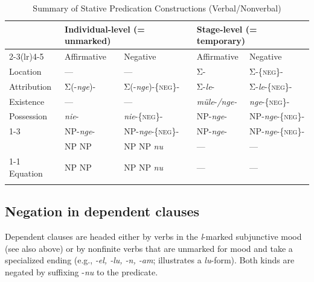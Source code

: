\documentclass[output=paper,colorlinks,citecolor=brown,draft]{langscibook}
\begin{document}
\begin{table} %
    \small 
    \begin{tabularx}{\textwidth}{Xllll}
    \lsptoprule
   & \multicolumn{2}{l}{{Individual-level (= unmarked)}} & \multicolumn{2}{l}{{Stage-level (= temporary)}}\\
   \cmidrule(lr){2-3}\cmidrule(lr){4-5}
    & {Affirmative} & {Negative} & \multicolumn{1}{l}{{Affirmative}} & {Negative}\\
\midrule 
    {Location} & --- & --- & \multicolumn{1}{l}{{Σ-}} & {Σ-\{\textsc{neg\}-}}\\
    \midrule
    {Attribution} & {Σ(-\textit{nge})-} & {Σ(-\textit{nge})-\{\textsc{neg\}-}} & \multicolumn{1}{l}{{Σ-\textit{le}{}-}} & {Σ-\textit{le}{}-\{\textsc{neg\}-}}\\
    \midrule
    {Existence} & --- & --- & \multicolumn{1}{l}{{\textit{müle}{}-\textit{/nge-}}} & {\textit{nge}{}-\{\textsc{neg\}-}}\\
\midrule
    {Possession} & {\textit{nie}{}-} & {\textit{nie}{}-\{\textsc{neg\}-}} &  {NP-\textit{nge}{}-} &  {NP-\textit{nge}{}-\{\textsc{neg\}-}}\\
\cmidrule(lr){1-3   }
    \multirow{2}{*}{Proper inclusion} & {NP-\textit{nge}{}-} & {NP-\textit{nge}{}-\{\textsc{neg}\}-} & {NP-\textit{nge}{}-}  & {NP-\textit{nge}{}-\{\textsc{neg\}-}}\\[.5em]
    &  {NP  NP} &  {NP  NP  \textit{nu}} &  {---} &  {---} \\
\cmidrule{1-1}\cmidrule{4-5}
    {Equation} & NP  NP & NP  NP  \textit{nu} & {---} &{---} \\
    \lspbottomrule
    \end{tabularx}
    \caption{Summary of Stative Predication Constructions (Verbal/Nonverbal)}
    \label{tab:mapu:3}
\end{table}


\subsection{Negation in dependent clauses}
\label{sec:mapu:2.4}

Dependent clauses are headed either by verbs in the \textit{l}{}-marked subjunctive mood  (see also  above) or by nonfinite verbs that are unmarked for mood and take a specialized ending (e.g., \textit{\nobreakdash-el, \nobreakdash-lu, -n, -am};  illustrates a \textit{lu}{}-form). Both kinds are negated by suffixing -\textit{nu} to the predicate.
\end{document}
